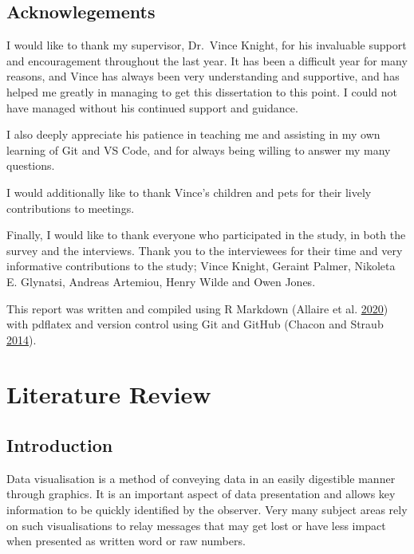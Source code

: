 \documentclass[
  11pt,
]{book}
\begin{document}
\newpage

\section*{Acknowlegements}

I would like to thank my supervisor, Dr.~Vince Knight, for his
invaluable support and encouragement throughout the last year. It has
been a difficult year for many reasons, and Vince has always been very
understanding and supportive, and has helped me greatly in managing to
get this dissertation to this point. I could not have managed without
his continued support and guidance.

I also deeply appreciate his patience in teaching me and assisting in my
own learning of Git and VS Code, and for always being willing to answer
my many questions.

I would additionally like to thank Vince's children and pets for their
lively contributions to meetings.

Finally, I would like to thank everyone who participated in the study,
in both the survey and the interviews. Thank you to the interviewees for
their time and very informative contributions to the study; Vince
Knight, Geraint Palmer, Nikoleta E. Glynatsi, Andreas Artemiou, Henry
Wilde and Owen Jones.

\vspace{5cm}

This report was written and compiled using R Markdown (Allaire et al.
\protect\hyperlink{ref-Allaire2020-sr}{2020}) with pdflatex and version
control using Git and GitHub (Chacon and Straub
\protect\hyperlink{ref-git}{2014}).

\centering

\raggedright

\clearpage

\tableofcontents

\chapter{Literature Review}

\section{Introduction}

Data visualisation is a method of conveying data in an easily digestible
manner through graphics. It is an important aspect of data presentation
and allows key information to be quickly identified by the observer.
Very many subject areas rely on such visualisations to relay messages
that may get lost or have less impact when presented as written word or
raw numbers.
\end{document}
